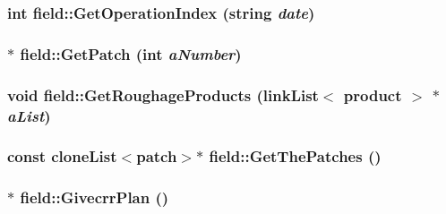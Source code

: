 \label{classfield_aebe4396575cb69945b1aa60e4837f48c}
\hypertarget{classfield_adc362e0bae809a3134164c4f66ef36d4}{
\subsubsection[{GetOperationIndex}]{\setlength{\rightskip}{0pt plus 5cm}int field::GetOperationIndex (string {\em date})}}
\label{classfield_adc362e0bae809a3134164c4f66ef36d4}
\hypertarget{classfield_a1c1d7b0d34468d382915e228f29d13ea}{
\subsubsection[{GetPatch}]{$\ast$ field::GetPatch (int {\em aNumber})}}
\label{classfield_a1c1d7b0d34468d382915e228f29d13ea}
\hypertarget{classfield_ae6d7a8d477727df7370ae82fb63c7781}{
\subsubsection[{GetRoughageProducts}]{\setlength{\rightskip}{0pt plus 5cm}void field::GetRoughageProducts ({\bf linkList}$<$ {\bf product} $>$ $\ast$ {\em aList})}}
\label{classfield_ae6d7a8d477727df7370ae82fb63c7781}
\hypertarget{classfield_abd533cd184e5e45a7bc1718f46962520}{
\subsubsection[{GetThePatches}]{\setlength{\rightskip}{0pt plus 5cm}const {\bf cloneList}$<${\bf patch}$>$$\ast$ field::GetThePatches ()}}
\label{classfield_abd533cd184e5e45a7bc1718f46962520}
\hypertarget{classfield_a83310dd2f0b81ec3178627f285e7535a}{
\subsubsection[{GivecrrPlan}]{$\ast$ field::GivecrrPlan ()}}

